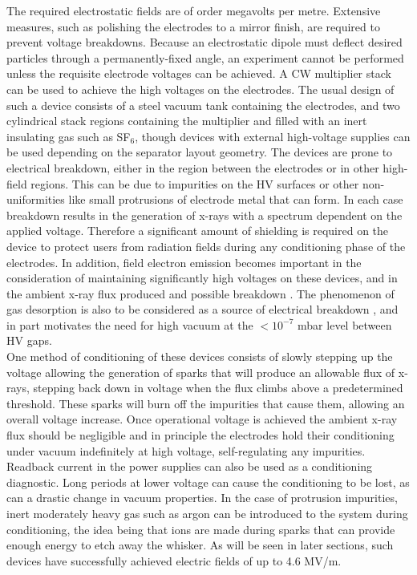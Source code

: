 The required electrostatic fields are of order megavolts per metre.  Extensive measures, such as polishing the electrodes to a mirror finish, are required to prevent voltage breakdowns.   Because an electrostatic dipole must deflect desired particles through a permanently-fixed angle,  an experiment  cannot be performed unless the requisite   electrode voltages can be achieved. A CW multiplier stack can be used to achieve the high voltages on the electrodes. The usual design of such a device consists of a steel vacuum tank containing the electrodes, and two cylindrical stack regions containing the multiplier and filled  with an inert insulating gas such as SF$_{6}$, though devices with external high-voltage supplies can be used depending on the separator layout geometry. The devices are prone to electrical breakdown, either in the region between the electrodes or in other high-field regions. This can be due to impurities on the HV surfaces or other non-uniformities like small protrusions of electrode metal that can form. In each case breakdown results in the generation of x-rays with a spectrum dependent on the applied voltage. Therefore a significant amount of shielding is required on the device to protect users from radiation fields during any conditioning phase of the electrodes. In addition, field electron emission becomes important in the consideration of maintaining significantly high voltages on these devices, and in the ambient x-ray flux produced and possible breakdown \cite{Dia98a}. The phenomenon of gas desorption is also to be considered as a source of electrical breakdown \cite{Dia98b}, and in part motivates the need for high vacuum at the $<10^{-7}$ mbar level between HV gaps. 
\\
One method of conditioning of these devices consists of slowly stepping up the voltage allowing the generation of sparks that will produce an allowable flux of x-rays, stepping back down in voltage when the flux climbs above a predetermined threshold. These sparks will burn off the impurities that cause them, allowing an overall voltage increase. Once operational voltage is achieved the ambient x-ray flux should be negligible and in principle the electrodes hold their conditioning under vacuum indefinitely at high voltage, self-regulating any impurities. Readback current in the power supplies can also be used as a conditioning diagnostic. Long periods at lower voltage can cause the conditioning to be lost, as can a drastic change in vacuum properties. In the case of protrusion impurities, inert moderately heavy gas such as argon can be introduced to the system during conditioning, the idea being that ions are made during sparks that can provide enough energy to etch away the whisker. As will be seen in later sections, such devices have successfully achieved electric fields of up to 4.6 MV/m.  

